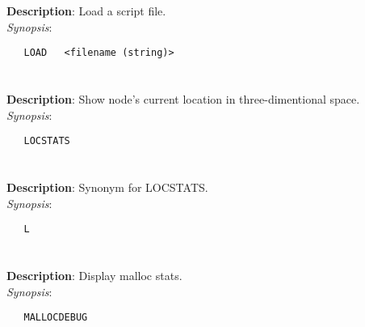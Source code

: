 \section{\quad{}}
\label{manpages:LOAD}
\label{manpages:load}
\vspace{-0.1in}
{\bf Description}: 	Load a script file.\\[1.5ex]
{\em Synopsis}:
\vspace{-0.05in}
\scriptsize
\begin{lstlisting}
   LOAD   <filename (string)>										
\end{lstlisting}
\normalsize
\vspace{-0.05in}


\section{\quad{}}
\label{manpages:LOCSTATS}
\label{manpages:locstats}
\vspace{-0.1in}
{\bf Description}: 	Show node's current location in three-dimentional space.\\[1.5ex]
{\em Synopsis}:
\vspace{-0.05in}
\scriptsize
\begin{lstlisting}
   LOCSTATS   							
\end{lstlisting}
\normalsize
\vspace{-0.05in}


\section{\quad{}}
\label{manpages:L}
\label{manpages:l}
\vspace{-0.1in}
{\bf Description}: 	Synonym for LOCSTATS.\\[1.5ex]
{\em Synopsis}:
\vspace{-0.05in}
\scriptsize
\begin{lstlisting}
   L   											
\end{lstlisting}
\normalsize
\vspace{-0.05in}


\section{\quad{}}
\label{manpages:MALLOCDEBUG}
\label{manpages:mallocdebug}
\vspace{-0.1in}
{\bf Description}: 	Display malloc stats.\\[1.5ex]
{\em Synopsis}:
\vspace{-0.05in}
\scriptsize
\begin{lstlisting}
   MALLOCDEBUG   																						
\end{lstlisting}
\normalsize
\vspace{-0.05in}


